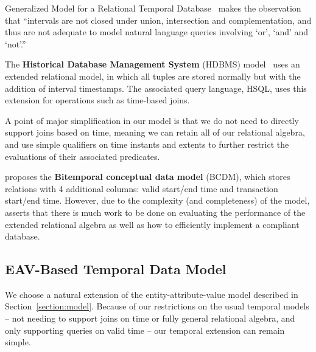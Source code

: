 Generalized Model for a Relational Temporal
Database~\cite{gadia1988generalized} makes the observation that ``intervals are
not closed under union, intersection and complementation, and thus are not
adequate to model natural language queries involving `or', `and' and `not'.''

The \textbf{Historical Database Management System} (HDBMS)
model~\cite{sarda1990extensions} uses an extended relational model, in which
all tuples are stored normally but with the addition of interval timestamps.
The associated query language, HSQL, uses this extension for operations such as
time-based joins. 

A point of major simplification in our model is that we do not need to directly
support joins based on time, meaning we can retain all of our relational
algebra, and use simple qualifiers on time instants and extents to further
restrict the evaluations of their associated predicates.

\cite{jensen1994unifying} proposes the \textbf{Bitemporal conceptual data
model} (BCDM), which stores relations with 4 additional columns: valid
start/end time and transaction start/end time. However, due to the complexity
(and completeness) of the model, \cite{jensen1999temporal} asserts that there
is much work to be done on evaluating the performance of the extended
relational algebra as well as how to efficiently implement a compliant
database.


\subsection{EAV-Based Temporal Data Model}

We choose a natural extension of the entity-attribute-value model described in Section~\ref{section:model}.
Because of our restrictions on the usual temporal models -- not needing to support joins on time or fully
general relational algebra, and only supporting queries on valid time -- our temporal extension can remain
simple.

